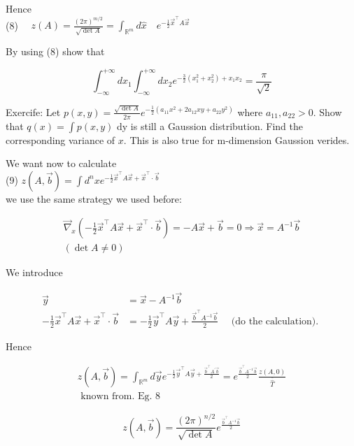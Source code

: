 \documentclass[10pt]{article}
\begin{document}
Hence\\
(8) $\quad z(A)=\frac{(2 \pi)^{m / 2}}{\sqrt{\operatorname{det} A}}=\int_{\mathbb{R}^{m}} d \hat{x} \quad e^{-\frac{1}{2} \vec{x}^{\top} A \vec{x}}$

By using (8) show that

$$
\int_{-\infty}^{+\infty} d x_{1} \int_{-\infty}^{+\infty} d x_{2} e^{-\frac{3}{2}\left(x_{1}^{2}+x_{2}^{2}\right)+x_{1} x_{2}}=\frac{\pi}{\sqrt{2}}
$$

Exercife: Let $p(x, y)=\frac{\sqrt{\operatorname{det} A}}{2 \pi} e^{-\frac{1}{2}\left(a_{11} x^{2}+2 a_{12} x y+a_{22} y^{2}\right)}$ where $a_{11}, a_{22}>0$. Show that $q(x)=\int p(x, y)$ dy is still a Gaussion distribution. Find the corresponding variance of $x$. This is also true for m-dimension Gaussion verides.

We want now to calculate\\
(9) $z(A, \vec{b})=\int d^{n} x e^{-\frac{1}{2} \vec{x}^{\top} A \vec{x}+\vec{x}^{\top} \cdot \vec{b}}$\\
we use the same strategy we used before:

$$
\begin{array}{r}
\vec{\nabla}_{x}\left(-\frac{1}{2} \vec{x}^{\top} A \vec{x}+\vec{x}^{\top} \cdot \vec{b}\right)=-A \vec{x}+\vec{b}=0 \Rightarrow \vec{x}=A^{-1} \vec{b} \\
(\operatorname{det} A \neq 0)
\end{array}
$$

We introduce

$$
\begin{aligned}
\vec{y} & =\vec{x}-A^{-1} \vec{b} \\
-\frac{1}{2} \vec{x}^{\top} A \vec{x}+\vec{x}^{\top} \cdot \vec{b} & =-\frac{1}{2} \vec{y}^{\top} A \vec{y}+\frac{\vec{b}^{\top} A^{-1} \vec{b}}{2} \quad \text { (do the calculation). }
\end{aligned}
$$

Hence

$$
\begin{array}{r}
z(A, \vec{b})=\int_{\mathbb{R}^{m}} d \vec{y} e^{-\frac{1}{2} \vec{y}^{\top} A \vec{y}+\frac{\vec{b}^{\top} A^{\prime} \vec{b}}{2}}=e^{\frac{\vec{b}^{\top} A^{-1} \vec{b}}{2}} \frac{z(A, 0)}{\overline{\widehat{T}}} \\
\text { known from. Eg. 8 }
\end{array}
$$


\begin{equation*}
z(A, \vec{b})=\frac{(2 \pi)^{n / 2}}{\sqrt{\operatorname{det} A}} e^{\frac{\vec{b}^{\top} A^{-1} \vec{b}}{2}} \tag{10}
\end{equation*}
\end{document}
